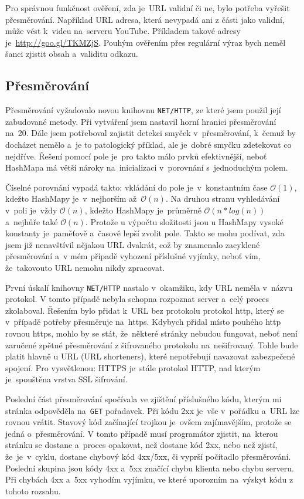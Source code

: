 \par Pro správnou funkčnost ověření, zda je~URL validní či ne, bylo potřeba vyřešit přesměrování. Například URL adresa, která nevypadá ani z části jako validní, může vést k~videu na~serveru YouTube. Příkladem takové adresy je~\url{http://goo.gl/TKMZjS}. Pouhým ověřením přes regulární výraz bych neměl šanci zjistit obsah a~validitu odkazu. 

\subsection{Přesměrování}
\par Přesměrování\cite{nethttp} vyžadovalo novou knihovnu \texttt{NET/HTTP}, ze které jsem použil její zabudované metody. Při vytváření jsem nastavil horní hranici přesměrování na~20. Dále jsem potřeboval zajistit detekci smyček v~přesměrování, k~čemuž by docházet nemělo a~je to patologický příklad, ale je~dobré smyčku zdetekovat co nejdříve. Řešení pomocí pole je~pro takto málo prvků efektivnější, neboť HashMapa má větší nároky na~inicializaci v~porovnání s~jednoduchým polem. 
\par Číselné porovnání vypadá takto: vkládání do pole je~v~konstantním čase $\mathcal{O}(1)$, kdežto HashMapy je~v~nejhorším až~$\mathcal{O}(n)$. Na druhou stranu vyhledávání v~poli je~vždy $\mathcal{O}(n)$, kdežto HashMapy je~průměrně $\mathcal{O}(n * log(n))$ a~nejhůře také $\mathcal{O}(n)$. Protože u výpočtu složitosti jsou u HashMapy vysoké konstanty je~paměťově a~časově lepší zvolit pole. Takto se mohu podívat, zda jsem již nenavštívil nějakou URL dvakrát, což by znamenalo zacyklené přesměrování a~v mém případě vyhození příslušné vyjímky, neboť vím, že~takovouto URL nemohu nikdy zpracovat.

\par První úskalí knihovny \texttt{NET/HTTP}\cite{nethttp} nastalo v~okamžiku, kdy URL neměla v~názvu protokol. V tomto případě nebyla schopna rozpoznat server a~celý proces zkolaboval. Řešením bylo přidat k~URL bez protokolu protokol http, který se v~případě potřeby přesměruje na~https. Kdybych přidal místo pouhého http rovnou https, mohlo by se stát, že~některé stránky nebudou fungovat, neboť není zaručené zpětné přesměrování z šifrovaného protokolu na~nešifrovaný. Tohle bude platit hlavně u  URL (URL shorteners), které nepotřebují navazovat zabezpečené spojení. Pro vysvětlenou: HTTPS je~stále protokol HTTP, nad kterým je~spouštěna vrstva SSL šifrování.
\par Poslední část přesměrování spočívala ve zjištění příslušného kódu, kterým mi stránka odpověděla na~\texttt{GET} pořadavek. Při kódu 2xx je~vše v~pořádku a~URL lze rovnou vrátit. Stavový kód začínající trojkou je~ovšem zajímavějším, protože se jedná o~přesměrování. V tomto případě musí programátor zjistit, na~kterou stránku se dostane a~proces opakovat, než dostane kód 2xx, nebo než zjistí, že~je~v~cyklu, dostane chybový kód 4xx/5xx, či vyprší počítadlo přesměrování. Poslední skupina jsou kódy 4xx a~5xx značící chybu klienta nebo chybu serveru. Při chybách 4xx a~5xx vyhodím vyjímku, ve které uporozním na~výskyt kódu z tohoto rozsahu.

